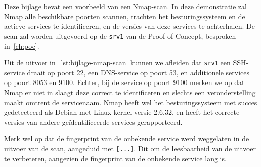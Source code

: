 
\chapter{}%
\label{ch:bijlage_nmap}

Deze bijlage bevat een voorbeeld van een Nmap-scan.
In deze demonstratie zal Nmap alle beschikbare poorten scannen, trachten het besturingssysteem en de actieve services te identificeren, en de versies van deze services te achterhalen.
De scan zal worden uitgevoerd op de \texttt{srv1} van de Proof of Concept, besproken in~\ref{ch:poc}.

Uit de uitvoer in~\ref{lst:bijlage-nmap-scan} kunnen we afleiden dat \texttt{srv1} een SSH-service draait op poort 22, een DNS-service op poort 53, en additionele services op poort 8053 en 9100.
Echter, bij de service op poort 9100 merken we op dat Nmap er niet in slaagt deze correct te identificeren en slechts een veronderstelling maakt omtrent de servicenaam.
Nmap heeft wel het besturingssysteem met succes gedetecteerd als Debian met Linux kernel versie 2.6.32, en heeft het correcte versies van andere ge\"identificeerde services gerapporteerd.

Merk wel op dat de fingerprint van de onbekende service werd weggelaten in de uitvoer van de scan, aangeduid met \texttt{[...]}.
Dit om de leesbaarheid van de uitvoer te verbeteren, aangezien de fingerprint van de onbekende service lang is.

